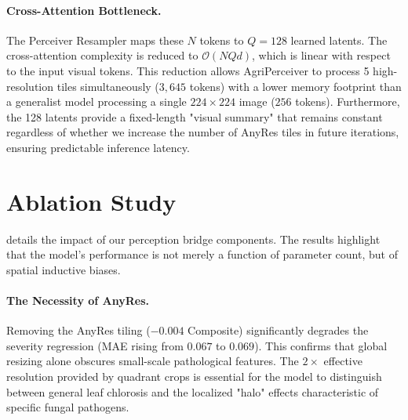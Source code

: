 \documentclass{article}
\newcommand{\ours}{AgriPerceiver}
\begin{document}
\paragraph{Cross-Attention Bottleneck.} 
The Perceiver Resampler maps these $N$ tokens to $Q=128$ learned latents. The cross-attention complexity is reduced to $\mathcal{O}(N Q d)$, which is linear with respect to the input visual tokens. This reduction allows \ours{} to process 5 high-resolution tiles simultaneously ($3,645$ tokens) with a lower memory footprint than a generalist model processing a single $224 \times 224$ image ($256$ tokens). Furthermore, the 128 latents provide a fixed-length "visual summary" that remains constant regardless of whether we increase the number of AnyRes tiles in future iterations, ensuring predictable inference latency.

\section{Ablation Study}
\label{app:ablation}

 details the impact of our perception bridge components. The results highlight that the model's performance is not merely a function of parameter count, but of spatial inductive biases.

\paragraph{The Necessity of AnyRes.}
Removing the AnyRes tiling ($-0.004$ Composite) significantly degrades the severity regression (MAE rising from $0.067$ to $0.069$). This confirms that global resizing alone obscures small-scale pathological features. The $2\times$ effective resolution provided by quadrant crops is essential for the model to distinguish between general leaf chlorosis and the localized "halo" effects characteristic of specific fungal pathogens.
\end{document}
